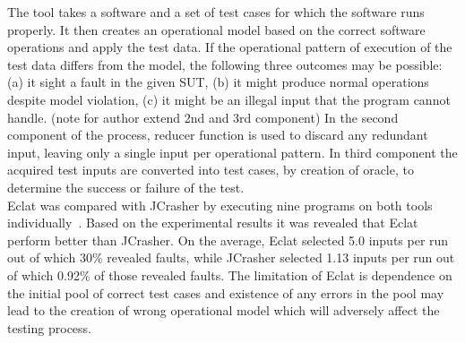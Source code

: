 \noindent The tool takes a software and a set of test cases for which the software runs properly. It then creates an operational model based on the correct software operations and apply the test data. If the operational pattern of execution of the test data differs from the model, the following three outcomes may be possible: (a) it sight a fault in the given SUT, (b) it might produce normal operations despite model violation, (c) it might be an illegal input that the program cannot handle. (note for author extend 2nd and 3rd component)
In the second component of the process, reducer function is used to discard any redundant input, leaving only a single input per operational pattern. In third component the acquired test inputs are converted into test cases, by creation of oracle, to determine the success or failure of the test. \\
\indent Eclat was compared with JCrasher by executing nine programs on  both tools individually~\cite{Pacheco2007b}. Based on the experimental results it was revealed that Eclat perform better than JCrasher. On the average, Eclat selected 5.0 inputs per run out of which 30\% revealed faults, while JCrasher selected 1.13 inputs per run out of which 0.92\% of those revealed faults. The limitation of Eclat is dependence on the initial pool of correct test cases and existence of any errors in the pool may lead to the creation of wrong operational model which will adversely affect the testing process.   



